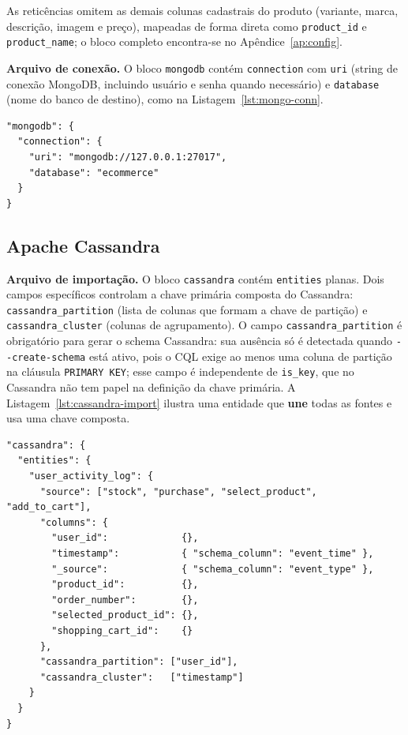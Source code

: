 As reticências omitem as demais colunas cadastrais do produto (variante, marca,
descrição, imagem e preço), mapeadas de forma direta como \texttt{product\_id} e
\texttt{product\_name}; o bloco completo encontra-se no Apêndice~\ref{ap:config}.

\textbf{Arquivo de conexão.} O bloco \texttt{mongodb} contém \texttt{connection}
com \texttt{uri} (string de conexão MongoDB, incluindo usuário e senha quando
necessário) e \texttt{database} (nome do banco de destino), como na
Listagem~\ref{lst:mongo-conn}.

\begin{lstlisting}[style=jsonstyle,caption={Fragmento de conexão MongoDB.},label={lst:mongo-conn}]
"mongodb": {
  "connection": {
    "uri": "mongodb://127.0.0.1:27017",
    "database": "ecommerce"
  }
}
\end{lstlisting}

\subsection{Apache Cassandra}

\textbf{Arquivo de importação.} O bloco \texttt{cassandra} contém \texttt{entities}
planas. Dois campos específicos controlam a chave primária composta do Cassandra:
\texttt{cassandra\_\allowbreak partition} (lista de colunas que formam a chave de partição)
e \texttt{cassandra\_\allowbreak cluster} (colunas de agrupamento). O campo
\texttt{cassandra\_\allowbreak partition} é obrigatório para gerar o schema Cassandra:
sua ausência só é detectada quando \texttt{-{}-create-schema} está ativo, pois o CQL
exige ao menos uma coluna de partição na cláusula \texttt{PRIMARY KEY}; esse campo é
independente de \texttt{is\_key}, que no Cassandra não tem papel na definição da chave
primária. A Listagem~\ref{lst:cassandra-import} ilustra uma entidade que \textbf{une}
todas as fontes e usa uma chave composta.

\begin{lstlisting}[style=jsonstyle,caption={Fragmento de importação Cassandra com união de fontes e chave composta.},label={lst:cassandra-import}]
"cassandra": {
  "entities": {
    "user_activity_log": {
      "source": ["stock", "purchase", "select_product", "add_to_cart"],
      "columns": {
        "user_id":             {},
        "timestamp":           { "schema_column": "event_time" },
        "_source":             { "schema_column": "event_type" },
        "product_id":          {},
        "order_number":        {},
        "selected_product_id": {},
        "shopping_cart_id":    {}
      },
      "cassandra_partition": ["user_id"],
      "cassandra_cluster":   ["timestamp"]
    }
  }
}
\end{lstlisting}

